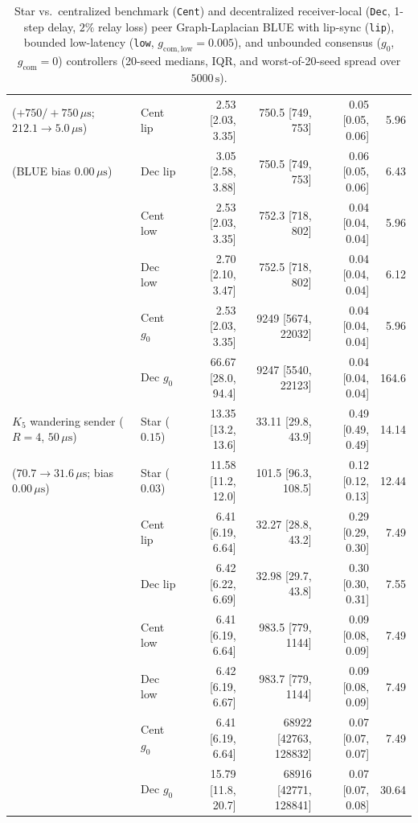 \documentclass[11pt,a4paper]{article}
\theoremstyle{definition}
\begin{document}
\begin{table}[htb]
\begin{tabular}{@{}ll r r r r@{}}
($+750/{+}750\,\mu\text{s}$; $212.1 \to 5.0\,\mu\text{s}$) & Cent lip & 2.53 [2.03, 3.35] & 750.5 [749, 753] & 0.05 [0.05, 0.06] & 5.96 \\
(BLUE bias $0.00\,\mu\text{s}$) & Dec lip  & 3.05 [2.58, 3.88] & 750.5 [749, 753] & 0.06 [0.05, 0.06] & 6.43 \\
 & Cent low & 2.53 [2.03, 3.35] & 752.3 [718, 802] & 0.04 [0.04, 0.04] & 5.96 \\
 & Dec low  & 2.70 [2.10, 3.47] & 752.5 [718, 802] & 0.04 [0.04, 0.04] & 6.12 \\
 & Cent $g_0$ & 2.53 [2.03, 3.35] & 9249 [5674, 22032] & 0.04 [0.04, 0.04] & 5.96 \\
 & Dec $g_0$  & 66.67 [28.0, 94.4] & 9247 [5540, 22123] & 0.04 [0.04, 0.04] & 164.6 \\
\midrule
$K_5$ wandering sender ($R{=}4$, $50\,\mu\text{s}$) & Star ($0.15$) & 13.35 [13.2, 13.6] & 33.11 [29.8, 43.9] & 0.49 [0.49, 0.49] & 14.14 \\
($70.7 \to 31.6\,\mu\text{s}$; bias $0.00\,\mu\text{s}$) & Star ($0.03$) & 11.58 [11.2, 12.0] & 101.5 [96.3, 108.5] & 0.12 [0.12, 0.13] & 12.44 \\
 & Cent lip & 6.41 [6.19, 6.64] & 32.27 [28.8, 43.2] & 0.29 [0.29, 0.30] & 7.49 \\
 & Dec lip  & 6.42 [6.22, 6.69] & 32.98 [29.7, 43.8] & 0.30 [0.30, 0.31] & 7.55 \\
 & Cent low & 6.41 [6.19, 6.64] & 983.5 [779, 1144] & 0.09 [0.08, 0.09] & 7.49 \\
 & Dec low  & 6.42 [6.19, 6.67] & 983.7 [779, 1144] & 0.09 [0.08, 0.09] & 7.49 \\
 & Cent $g_0$ & 6.41 [6.19, 6.64] & 68922 [42763, 128832] & 0.07 [0.07, 0.07] & 7.49 \\
 & Dec $g_0$  & 15.79 [11.8, 20.7] & 68916 [42771, 128841] & 0.07 [0.07, 0.08] & 30.64 \\
\bottomrule
\end{tabular}
\caption{Star vs.\ centralized benchmark (\texttt{Cent}) and decentralized
receiver-local (\texttt{Dec}, 1-step delay, $2\%$ relay loss) peer
Graph-Laplacian BLUE with lip-sync (\texttt{lip}), bounded low-latency
(\texttt{low}, $g_{\mathrm{com,low}} = 0.005$), and unbounded consensus
(\texttt{$g_0$}, $g_{\mathrm{com}} = 0$) controllers (20-seed medians, IQR, and
worst-of-20-seed spread over $5000\,\text{s}$).}
\label{tab:peer}
\end{table}
\end{document}
